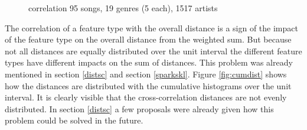 \begin{figure}[htbp]
	\centering
	\caption{correlation 95 songs, 19 genres (5 each), 1517 artists}
	\label{fig:corr2}
\end{figure}\FloatBarrier

\noindent The correlation of a feature type with the overall distance is a sign of the impact of the feature type on the overall distance from the weighted sum. But because not all distances are equally distributed over the unit interval the different feature types have different impacts on the sum of distances. This problem was already mentioned in section \ref{distsc} and section \ref{sparkskl}. Figure \ref{fig:cumdist} shows how the distances are distributed with the cumulative histograms over the unit interval. It is clearly visible that the cross-correlation distances are not evenly distributed. In section \ref{distsc} a few proposals were already given how this problem could be solved in the future. 

